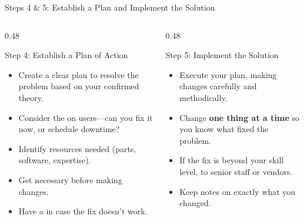 \documentclass[aspectratio=169]{beamer}  %
\begin{document}

\begin{frame}{Steps 4 \& 5: Establish a Plan and Implement the Solution}
    \begin{columns}[T]
        \begin{column}{0.48\textwidth}
            \begin{block}{Step 4: Establish a Plan of Action}
                \begin{itemize}
                    \item Create a clear plan to resolve the problem based on your confirmed theory.
                    \item Consider the  on users---can you fix it now, or schedule downtime?
                    \item Identify resources needed (parts, software, expertise).
                    \item Get necessary  before making changes.
                    \item Have a  in case the fix doesn't work.
                \end{itemize}
            \end{block}
        \end{column}
        \begin{column}{0.48\textwidth}
            \begin{block}{Step 5: Implement the Solution}
                \begin{itemize}
                    \item Execute your plan, making changes carefully and methodically.
                    \item Change \textbf{one thing at a time} so you know what fixed the problem.
                    \item If the fix is beyond your skill level,  to senior staff or vendors.
                    \item Keep notes on exactly what you changed.
                \end{itemize}
            \end{block}
        \end{column}
    \end{columns}
\end{frame}
\end{document}
